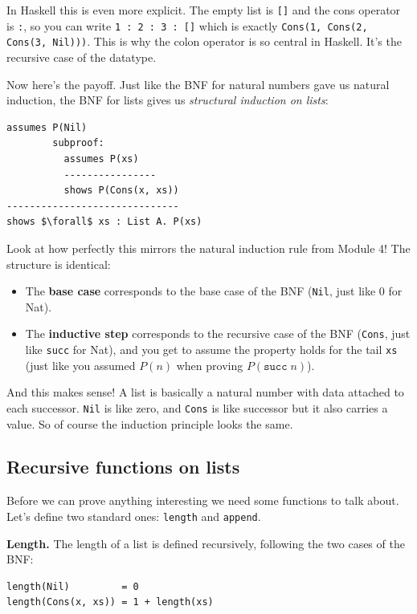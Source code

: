 \documentclass[11pt]{article}
\begin{document}
In Haskell this is even more explicit. The empty list is \texttt{[]} and the cons operator is \texttt{:}, so you can write \texttt{1 : 2 : 3 : []} which is exactly \texttt{Cons(1, Cons(2, Cons(3, Nil)))}. This is why the colon operator is so central in Haskell. It's the recursive case of the datatype.

Now here's the payoff. Just like the BNF for natural numbers gave us natural induction, the BNF for lists gives us \emph{structural induction on lists}:

\begin{lstlisting}
assumes P(Nil)
        subproof:
          assumes P(xs)
          ----------------
          shows P(Cons(x, xs))
------------------------------
shows $\forall$ xs : List A. P(xs)
\end{lstlisting}

Look at how perfectly this mirrors the natural induction rule from Module 4! The structure is identical:
\begin{itemize}
  \item The \textbf{base case} corresponds to the base case of the BNF (\texttt{Nil}, just like $0$ for Nat).
  \item The \textbf{inductive step} corresponds to the recursive case of the BNF (\texttt{Cons}, just like \texttt{succ} for Nat), and you get to assume the property holds for the tail \texttt{xs} (just like you assumed $P(n)$ when proving $P(\texttt{succ}\; n)$).
\end{itemize}

And this makes sense! A list is basically a natural number with data attached to each successor. \texttt{Nil} is like zero, and \texttt{Cons} is like successor but it also carries a value. So of course the induction principle looks the same.

\subsection{Recursive functions on lists}

Before we can prove anything interesting we need some functions to talk about. Let's define two standard ones: \texttt{length} and \texttt{append}.

\textbf{Length.} The length of a list is defined recursively, following the two cases of the BNF:

\begin{lstlisting}
length(Nil)         = 0
length(Cons(x, xs)) = 1 + length(xs)
\end{lstlisting}
\end{document}
